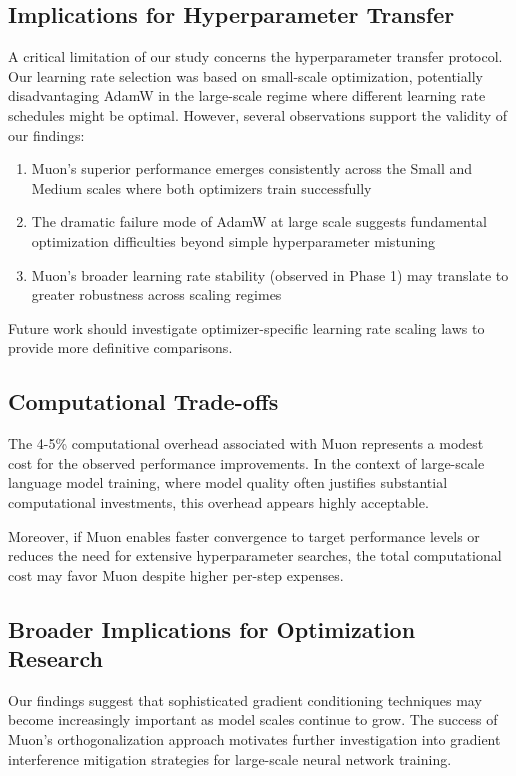 \documentclass[11pt,a4paper]{article}
\begin{document}
\subsection{Implications for Hyperparameter Transfer}

A critical limitation of our study concerns the hyperparameter transfer protocol. Our learning rate selection was based on small-scale optimization, potentially disadvantaging AdamW in the large-scale regime where different learning rate schedules might be optimal. However, several observations support the validity of our findings:

\begin{enumerate}[leftmargin=*]
    \item Muon's superior performance emerges consistently across the Small and Medium scales where both optimizers train successfully
    \item The dramatic failure mode of AdamW at large scale suggests fundamental optimization difficulties beyond simple hyperparameter mistuning
    \item Muon's broader learning rate stability (observed in Phase 1) may translate to greater robustness across scaling regimes
\end{enumerate}

Future work should investigate optimizer-specific learning rate scaling laws to provide more definitive comparisons.

\subsection{Computational Trade-offs}

The 4-5\% computational overhead associated with Muon represents a modest cost for the observed performance improvements. In the context of large-scale language model training, where model quality often justifies substantial computational investments, this overhead appears highly acceptable.

Moreover, if Muon enables faster convergence to target performance levels or reduces the need for extensive hyperparameter searches, the total computational cost may favor Muon despite higher per-step expenses.

\subsection{Broader Implications for Optimization Research}

Our findings suggest that sophisticated gradient conditioning techniques may become increasingly important as model scales continue to grow. The success of Muon's orthogonalization approach motivates further investigation into gradient interference mitigation strategies for large-scale neural network training.
\end{document}
